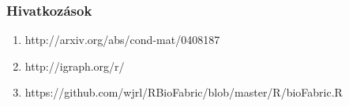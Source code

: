 \documentclass{beamer}
\begin{document}
\begin{frame}[plain]
\frametitle{Hivatkozások}
\small{
\begin{enumerate}
\item http://arxiv.org/abs/cond-mat/0408187
\item http://igraph.org/r/
\item https://github.com/wjrl/RBioFabric/blob/master/R/bioFabric.R
\end{enumerate}
}
\end{frame}


\end{document}
